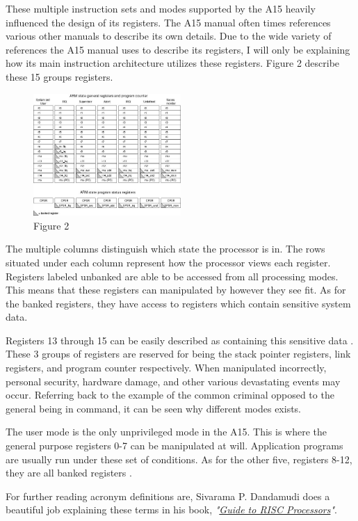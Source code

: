 \documentclass[12pt]{scrreprt}
\begin{document}
	These multiple instruction sets and modes supported by the A15 heavily influenced the design of its registers.
	The A15 manual often times references various other manuals to describe its own details.
	Due to the wide variety of references the A15 manual uses to describe its registers, I will only be explaining how its main instruction architecture utilizes these registers.
	Figure 2 describe these 15 groups registers.

	\begin{figure}[h]
		\centering
			\includegraphics[width=0.5\textwidth]{registers}
		\caption{Figure 2}
	\end{figure}

	The multiple columns distinguish which state the processor is in.
	The rows situated under each column represent how the processor views each register.
	Registers labeled unbanked are able to be accessed from all processing modes.
	This means that these registers can manipulated by however they see fit.
	As for the banked registers, they have access to registers which contain sensitive system data.

	Registers 13 through 15 can be easily described as containing this sensitive data \autocite[A2-45]{a7man}.
	These 3 groups of registers are reserved for being the stack pointer registers, link registers, and program counter respectively.
	When manipulated incorrectly, personal security, hardware damage, and other various devastating events may occur.
	Referring back to the example of the common criminal opposed to the general being in command, it can be seen why different modes exists.

	The user mode is the only unprivileged mode in the A15.
	This is where the general purpose registers 0-7 can be manipulated at will.
	Application programs are usually run under these set of conditions.
	As for the other five, registers 8-12, they are all banked registers \autocite[123]{riscGuide}.

	For further reading acronym definitions are, Sivarama P. Dandamudi does a beautiful job explaining these terms in his book, \textit{"\underline{Guide to RISC Processors}"}.
\end{document}
